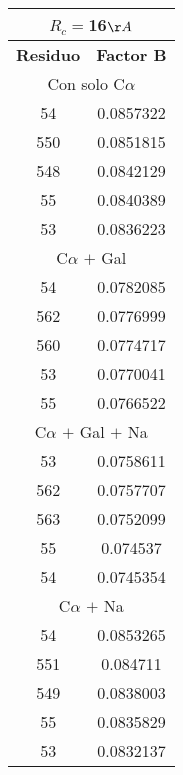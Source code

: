 \begin{tabular}[c]{|c|c|}
\multicolumn{2}{c}{$R_c=$16$\AA$}\\\hline
\textbf{Residuo}&\textbf{Factor B}\\\hline
\multicolumn{2}{c}{Con solo C$\alpha$}\\\hline
        54& 0.0857322\\
       550& 0.0851815\\
       548& 0.0842129\\
        55& 0.0840389\\
        53& 0.0836223\\\hline
\multicolumn{2}{c}{C$\alpha$ $+$ Gal}\\\hline
        54& 0.0782085\\
       562& 0.0776999\\
       560& 0.0774717\\
        53& 0.0770041\\
        55& 0.0766522\\\hline
\multicolumn{2}{c}{C$\alpha$ $+$ Gal $+$ Na}\\\hline
        53& 0.0758611\\
       562& 0.0757707\\
       563& 0.0752099\\
        55&  0.074537\\
        54& 0.0745354\\\hline
\multicolumn{2}{c}{C$\alpha$ $+$ Na}\\\hline
        54& 0.0853265\\
       551&  0.084711\\
       549& 0.0838003\\
        55& 0.0835829\\
        53& 0.0832137\\\hline
\end{tabular}
